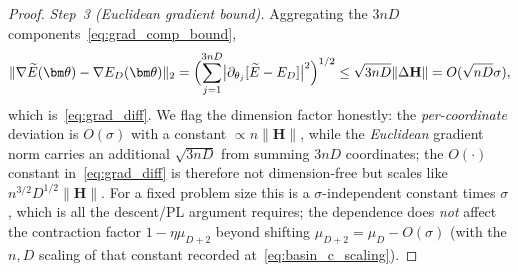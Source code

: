 \documentclass[11pt]{article}
\theoremstyle{plain}
\theoremstyle{plain}
\begin{document}
\begin{proof}
\emph{Step~3 (Euclidean gradient bound).}
Aggregating the $3nD$ components~\eqref{eq:grad_comp_bound},
\begin{equation}\label{eq:grad_l2}
  \|\nabla\widetilde{E}(\bm\theta)-\nabla E_D(\bm\theta)\|_2
  =\Bigl(\sum_{j=1}^{3nD}
     \bigl|\partial_{\theta_j}[\widetilde{E}-E_D]\bigr|^2\Bigr)^{1/2}
  \le\sqrt{3nD} \|\Delta\mathbf{H}\|=O(\sqrt{nD} \sigma),
\end{equation}
which is~\eqref{eq:grad_diff}.  We flag the dimension factor honestly:
the \emph{per-coordinate} deviation is $O(\sigma)$ with a constant
$\propto n\|\mathbf{H}\|$, while the \emph{Euclidean} gradient norm carries
an additional $\sqrt{3nD}$ from summing $3nD$ coordinates; the $O(\cdot)$
constant in~\eqref{eq:grad_diff} is therefore not dimension-free but
scales like $n^{3/2}D^{1/2}\|\mathbf{H}\|$.  For a fixed problem size this
is a $\sigma$-independent constant times $\sigma$, which is all the
descent/PL argument requires; the dependence does \emph{not} affect the
contraction factor $1-\eta\mu_{D+2}$ beyond shifting
$\mu_{D+2}=\mu_D-O(\sigma)$ (with the $n,D$ scaling of that constant
recorded at~\eqref{eq:basin_c_scaling}).


\end{proof}
\end{document}

